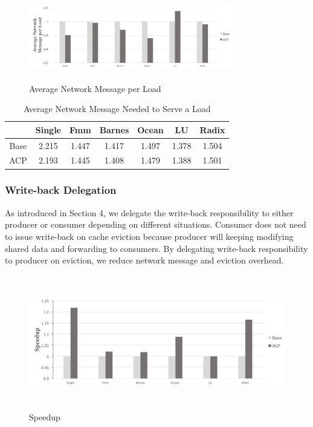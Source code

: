 \documentclass[11pt,conference]{IEEEtran}
\begin{document}
\begin{figure}[!h]
\centering
\captionsetup{justification=centering}
\includegraphics[width=3.5in,height=1.5in]{avg_network_msg_per_load.png}
\caption{Average Network Message per Load}
\label{avg_network_msg_per_load}
\end{figure}
\FloatBarrier

\begin{table}[!h]
\renewcommand{\arraystretch}{2.5}
\caption{Average Network Message Needed to Serve a Load}
\label{table_msg}
\centering
\begin{tabular}{|c|c|c|c|c|c|c|}
\hline
 & Single & Fmm & Barnes & Ocean & LU & Radix \\
\hline
Base & 2.215 & 1.447 & 1.417 & 1.497 & 1.378 & 1.504 \\
\hline
ACP & 2.193 & 1.445 & 1.408 & 1.479 & 1.388 & 1.501 \\
\hline
\end{tabular}
\end{table}
\FloatBarrier

\subsubsection{Write-back Delegation}
As introduced in Section 4, we delegate the write-back responsibility to either producer or consumer depending on different situations. Consumer does not need to issue write-back on cache eviction because producer will keeping modifying shared data and forwarding to consumers. By delegating write-back responsibility to producer on eviction, we reduce network message and eviction overhead.

\newpage

\begin{figure}[!h]
\centering
\hfil
\captionsetup{justification=centering}
\includegraphics[width=7.5in,height=2.3in]{speedup.png}
\caption{Speedup}
\label{speedup}
\end{figure}
\FloatBarrier
\end{document}
